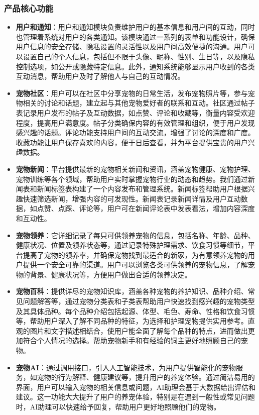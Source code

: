 \subsubsection{产品核心功能}
\begin{itemize}
\item \textbf{用户和通知}：用户和通知模块负责维护用户的基本信息和用户间的互动，同时也管理着系统对用户的各类通知。该模块通过一系列的表单和功能设计，确保用户信息的安全存储、隐私设置的灵活性以及用户间高效便捷的沟通。用户可以设置自己的个人信息，包括但不限于头像、昵称、性别、生日等，以及隐私控制选项，如公开或隐藏特定信息。此外，通知系统能够显示用户收到的各类互动消息，帮助用户及时了解他人与自己的互动情况。
 \item \textbf{宠物社区}：用户可以在社区中分享宠物的日常生活，发布宠物照片等，参与宠物相关的讨论和话题，建立起与其他宠物爱好者的联系和互动。社区通过帖子表记录用户发布的帖子及互动数据，如点赞、评论和收藏等，衡量内容受欢迎程度，提高用户满意度。帖子分类确保内容的有效管理和组织，便于用户发现感兴趣的话题。评论功能支持用户间的互动交流，增强了讨论的深度和广度。收藏功能让用户保存喜欢的内容，便于日后查看，并为平台提供宝贵的用户兴趣数据。
    \item \textbf{宠物新闻}：平台提供最新的宠物相关新闻和资讯，涵盖宠物健康、宠物护理、宠物训练等各个领域，帮助用户实时掌握宠物行业的动态和趋势。我们通过新闻表和新闻标签表构建了一个内容发布和管理系统。新闻标签帮助用户根据兴趣快速筛选新闻，增强内容的可发现性。新闻表记录新闻详情及用户互动数据，如点赞、点踩、评论等，用户可在新闻评论表中发表看法，增加内容深度和互动性。
    \item \textbf{宠物领养}：它详细记录了每只可供领养宠物的信息，包括名称、年龄、品种、健康状况、位置及领养状态等，通过记录特殊护理需求、饮食习惯等细节，平台提高了宠物的领养率，并确保宠物找到最适合的新家，为有意领养宠物的用户提供一个安全可靠的渠道。用户可以浏览各类可供领养的宠物信息，了解宠物的背景、健康状况等，方便用户做出合适的领养决定。
    \item \textbf{宠物百科}：提供详尽的宠物知识库，涵盖各种宠物的养护知识、品种介绍、常见问题解答等，通过宠物分类表和子类表帮助用户快速找到感兴趣的宠物类型及其具体品种。每个品种介绍包括起源、体型、毛色、寿命、性格和饮食习惯等，帮助用户深入了解不同品种的特征，为选择和护理宠物提供实用参考。直观的图片和文字描述相结合，使用户能全面了解每个品种的特点，进而做出更加符合个人情况的选择。帮助宠物新手和有经验的饲主更好地照顾自己的宠物。
    \item \textbf{宠物AI}：通过调用接口，引入人工智能技术，为用户提供智能化的宠物服务，如宠物的行为解释、健康建议等，提升用户的养宠体验。通过简洁易用的界面，用户可以输入宠物的相关信息或问题，AI助理会基于大数据给出评估和建议。这一功能大大提升了用户的养宠体验，特别是在遇到一般性或常见问题时，AI助理可以快速给予回复，帮助用户更好地照顾他们的宠物。
\end{itemize}

